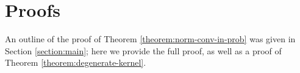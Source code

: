 \documentclass[]{article}
\begin{document}
\section{Proofs}\label{section:proofs}

An outline of the proof of Theorem \ref{theorem:norm-conv-in-prob} was given in Section \ref{section:main}; here we provide the full proof, as well as a proof of Theorem \ref{theorem:degenerate-kernel}. 
%
%
%
%
\end{document}
